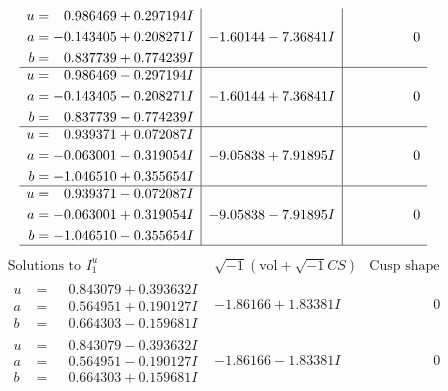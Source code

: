 \documentclass[1p]{elsarticle_modified}
\theoremstyle{definition}
\newcommand{\I}{\sqrt{-1}}
\begin{document}
$$\begin{array}{c|c|c}
\begin{aligned}
u &= \phantom{-}0.986469 + 0.297194 I \\
a &= -0.143405 + 0.208271 I \\
b &= \phantom{-}0.837739 + 0.774239 I\end{aligned}
 & -1.60144 - 7.36841 I & \phantom{-0.000000 } 0 \\ \hline\begin{aligned}
u &= \phantom{-}0.986469 - 0.297194 I \\
a &= -0.143405 - 0.208271 I \\
b &= \phantom{-}0.837739 - 0.774239 I\end{aligned}
 & -1.60144 + 7.36841 I & \phantom{-0.000000 } 0 \\ \hline\begin{aligned}
u &= \phantom{-}0.939371 + 0.072087 I \\
a &= -0.063001 - 0.319054 I \\
b &= -1.046510 + 0.355654 I\end{aligned}
 & -9.05838 + 7.91895 I & \phantom{-0.000000 } 0 \\ \hline\begin{aligned}
u &= \phantom{-}0.939371 - 0.072087 I \\
a &= -0.063001 + 0.319054 I \\
b &= -1.046510 - 0.355654 I\end{aligned}
 & -9.05838 - 7.91895 I & \phantom{-0.000000 } 0\\
 \hline 
 \end{array}$$\newpage$$\begin{array}{c|c|c}  
\text{Solutions to }I^u_{1}& \I (\text{vol} + \sqrt{-1}CS) & \text{Cusp shape}\\
 \hline 
\begin{aligned}
u &= \phantom{-}0.843079 + 0.393632 I \\
a &= \phantom{-}0.564951 + 0.190127 I \\
b &= \phantom{-}0.664303 - 0.159681 I\end{aligned}
 & -1.86166 + 1.83381 I & \phantom{-0.000000 } 0 \\ \hline\begin{aligned}
u &= \phantom{-}0.843079 - 0.393632 I \\
a &= \phantom{-}0.564951 - 0.190127 I \\
b &= \phantom{-}0.664303 + 0.159681 I\end{aligned}
 & -1.86166 - 1.83381 I & \phantom{-0.000000 } 0 \\ \hline\begin{aligned}

\end{aligned}
\end{array}$$
\end{document}

